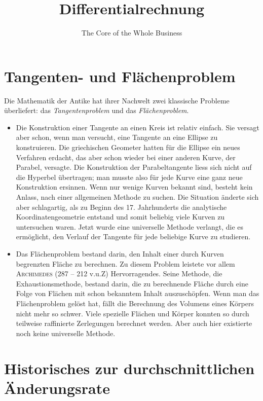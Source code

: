 \documentclass[%
<<<<<<< Updated upstream
11pt,%
twoside,%
titlepage,%
german,%
=======
11pt,%
twoside,%
titlepage,%
swissgerman,%
>>>>>>> Stashed changes
headsepline%
]{scrartcl}
\title{Differentialrechnung}
\subtitle{The Core of the Whole Business}
\author{}
\date{}
\theoremstyle{definition}
\theoremstyle{plain}
\begin{document}
\maketitle
\tableofcontents
\cleardoublepage

\section{Tangenten- und Flächenproblem}
Die Mathematik der Antike hat ihrer Nachwelt zwei klassische Probleme überliefert: das \emph{Tangentenproblem} und das \emph{Flächenproblem}.

\begin{itemize}
\item Die Konstruktion einer Tangente an einen Kreis ist relativ einfach. Sie versagt aber schon, wenn man versucht, eine Tangente an eine Ellipse zu konstruieren. Die griechischen Geometer hatten für die Ellipse ein neues Verfahren erdacht, das aber schon wieder bei einer anderen Kurve, der Parabel, versagte. Die Konstruktion der Parabeltangente liess sich nicht auf die Hyperbel übertragen; man musste also für jede Kurve eine ganz neue Konstruktion ersinnen. Wenn nur wenige Kurven bekannt sind, besteht kein Anlass, nach einer allgemeinen Methode zu suchen. Die Situation änderte sich aber schlagartig, als zu Beginn des 17. Jahrhunderts die analytische Koordinatengeometrie entstand und somit beliebig viele Kurven zu untersuchen waren. Jetzt wurde eine universelle Methode verlangt, die es ermöglicht, den Verlauf der Tangente für jede beliebige Kurve zu studieren.
\end{itemize}

\begin{itemize}
\item Das Flächenproblem bestand darin, den Inhalt einer durch Kurven begrenzten Fläche zu berechnen. Zu diesem Problem leistete vor allem \textsc{Archimedes} (287 -- 212 v.u.Z) Hervorragendes. Seine Methode, die Exhaustionsmethode, bestand darin, die zu berechnende Fläche durch eine Folge von Flächen mit schon bekanntem Inhalt auszuschöpfen. Wenn man das Flächenproblem gelöst hat, fällt die Berechnung des Volumens eines Körpers nicht mehr so schwer. Viele spezielle Flächen und Körper konnten so durch teilweise raffinierte Zerlegungen berechnet werden. Aber auch hier existierte noch keine universelle Methode.
\end{itemize}

\clearpage

\section{Historisches zur durchschnittlichen Änderungsrate}
\end{document}
